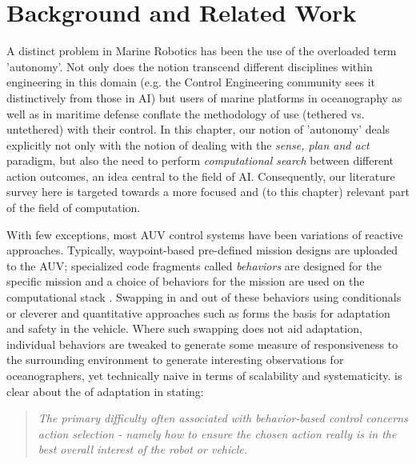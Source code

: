 \section{Background and Related Work}
\label{sec:related}


A distinct problem in Marine Robotics has been the use of the
overloaded term 'autonomy'. Not only does the notion transcend
different disciplines within engineering in this domain (e.g. the
Control Engineering community sees it distinctively from those in AI)
but users of marine platforms in oceanography as well as in maritime
defense conflate the methodology of use (tethered vs. untethered) with
their control. In this chapter, our notion of 'autonomy' deals
explicitly not only with the notion of dealing with the \emph{sense,
  plan and act} paradigm, but also the need to perform
\emph{computational search} between different action outcomes, an idea
central to the field of AI. Consequently, our literature survey here
is targeted towards a more focused and (to this chapter) relevant part
of the field of computation.

With few exceptions, most AUV control systems have been variations of
reactive approaches.  Typically, waypoint-based pre-defined mission
designs are uploaded to the AUV; specialized code fragments called
\emph{behaviors} are designed for the specific mission and a choice of
behaviors for the mission are used on the computational stack
\cite{bellingham94}. Swapping in and out of these behaviors using
conditionals or cleverer and quantitative approaches such as
\cite{Benjamin:2004} forms the basis for adaptation and safety in the
vehicle. Where such swapping does not aid adaptation, individual
behaviors are tweaked to generate some measure of responsiveness to
the surrounding environment \cite{yanwu08} to generate interesting
observations for oceanographers, yet technically naive in terms of
scalability and systematicity. \cite{Benjamin2006} is clear about the
 of adaptation in stating:

{\footnotesize
  \begin{quote}
\small \emph{The primary difficulty often associated with behavior-based control
concerns action selection - namely how to ensure the chosen action
really is in the best overall interest of the robot or vehicle.}
\end{quote}
} 

